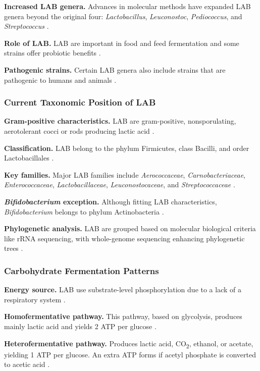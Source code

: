 \textbf{Increased LAB genera.} Advances in molecular methods have expanded LAB genera beyond the original four: \textit{Lactobacillus}, \textit{Leuconostoc}, \textit{Pediococcus}, and \textit{Streptococcus} \cite*{L3-LAB}.

\textbf{Role of LAB.} LAB are important in food and feed fermentation and some strains offer probiotic benefits \cite*{L3-LAB}.

\textbf{Pathogenic strains.} Certain LAB genera also include strains that are pathogenic to humans and animals \cite*{L3-LAB}.

\subsubsection*{Current Taxonomic Position of LAB}
\textbf{Gram-positive characteristics.} LAB are gram-positive, nonsporulating, aerotolerant cocci or rods producing lactic acid \cite*{L3-LAB}.

\textbf{Classification.} LAB belong to the phylum Firmicutes, class Bacilli, and order Lactobacillales \cite*{L3-LAB}.

\textbf{Key families.} Major LAB families include \textit{Aerococcaceae}, \textit{Carnobacteriaceae}, \textit{Enterococcaceae}, \textit{Lactobacillaceae}, \textit{Leuconostocaceae}, and \textit{Streptococcaceae} \cite*{L3-LAB}.

\textbf{\textit{Bifidobacterium} exception.} Although fitting LAB characteristics, \textit{Bifidobacterium} belongs to phylum Actinobacteria \cite*{L3-LAB}.

\textbf{Phylogenetic analysis.} LAB are grouped based on molecular biological criteria like rRNA sequencing, with whole-genome sequencing enhancing phylogenetic trees \cite*{L3-LAB}.

\subsubsection{Carbohydrate Fermentation Patterns}
\textbf{Energy source.} LAB use substrate-level phosphorylation due to a lack of a respiratory system \cite*{L3-LAB}.

\textbf{Homofermentative pathway.} This pathway, based on glycolysis, produces mainly lactic acid and yields 2 ATP per glucose \cite*{L3-LAB}.

\textbf{Heterofermentative pathway.} Produces lactic acid, CO\textsubscript{2}, ethanol, or acetate, yielding 1 ATP per glucose. An extra ATP forms if acetyl phosphate is converted to acetic acid \cite*{L3-LAB}.

